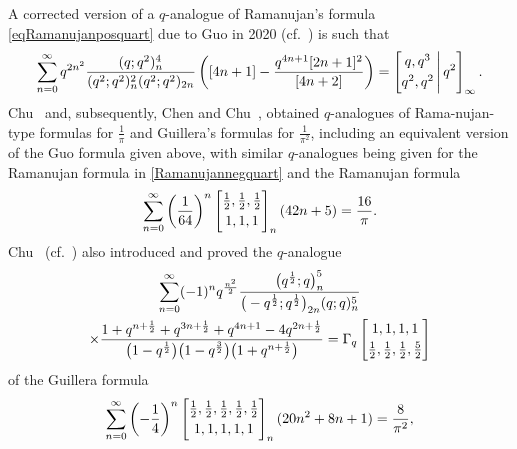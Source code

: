 \documentclass[12pt]{article}
\begin{document}
 A corrected version of a $q$-analogue of Ramanujan's formula \eqref{eqRamanujanposquart} due to Guo 
 in 2020 (cf.~\cite[Theorem 1.1]{Guo2020}) is such that 
 $$ \sum_{n=0}^{\infty} 
 q^{2n^2} \frac{ ( q;q^2 )_{n}^4 }{ ( q^2; q^2 )_{n}^{2} (q^2;q^2)_{2n} } 
 \left( [4n+1] - \frac{q^{4n+1} [2n+1]^2}{ [4n+2] } \right) 
 = \left[ \begin{matrix} q, q^3 \vspace{1mm} \\ 
 q^2, q^2 \end{matrix} \, \Bigg| \, q^2 \right]_{\infty}. $$ 
 Chu~\cite{Chu2018} and, subsequently, Chen and Chu~\cite{ChenChu2021RJ}, obtained $q$-analogues of Rama-nujan-type
 formulas for $\frac{1}{\pi}$ and Guillera's formulas for $\frac{1}{\pi^2}$, 
 including an equivalent version of the Guo formula given above, 
 with similar $q$-analogues being given for 
 the Ramanujan formula in \eqref{Ramanujannegquart} and the Ramanujan formula 
\begin{equation}\label{Ramanujan1over64}
 \sum_{n = 0}^{\infty} 
 \left( \frac{1}{64} \right)^{n} 
 \left[ \begin{matrix} \frac{1}{2}, \frac{1}{2}, \frac{1}{2} \vspace{1mm} \\ 
 1, 1, 1 \end{matrix} \right]_{n} (42n+5) 
 = \frac{16}{\pi}. 
\end{equation}
 Chu~\cite{Chu2018} (cf.~\cite{ChenChu2021RJ}) also introduced and proved the $q$-analogue 
\begin{multline*}
 \sum_{n=0}^{\infty} (-1)^n q^{\frac{n^2}{2}} 
 \frac{ \big(q^{\frac{1}{2}}; q\big)_{n}^{5} }{ \big( -q^{\frac{1}{2}}; q^{\frac{1}{2}} \big)_{2n} 
 (q;q)_{n}^{5} } \\ 
 \times \frac{1 + q^{n + \frac{1}{2}} + q^{3n+\frac{1}{2}} + q^{4n+1} 
 - 4 q^{2n + \frac{1}{2}} }{ \big( 1-q^{\frac{1}{2}} \big) 
 \big( 1- q^{\frac{3}{2}} \big) \big( 1 + q^{n + \frac{1}{2}} \big) } = 
 \Gamma_{q} \left[ \begin{matrix} 
 1, 1, 1, 1 \vspace{1mm} \\ 
 \frac{1}{2}, \frac{1}{2}, \frac{1}{2}, \frac{5}{2} \end{matrix} \right] 
 \end{multline*}
 of the Guillera formula~\cite{Guillera2006}
\begin{equation*}
 \sum_{n = 
 0}^{\infty} 
 \left( -\frac{1}{4} \right)^{n} 
 \left[ \begin{matrix} 
 \frac{1}{2}, \frac{1}{2}, \frac{1}{2}, \frac{1}{2}, \frac{1}{2} \vspace{1mm} \\ 
 1, 1, 1, 1, 1 \end{matrix} \right]_{n} (20n^2 + 8 n + 1) 
 = \frac{8}{\pi^2}, 
\end{equation*}
\end{document}
